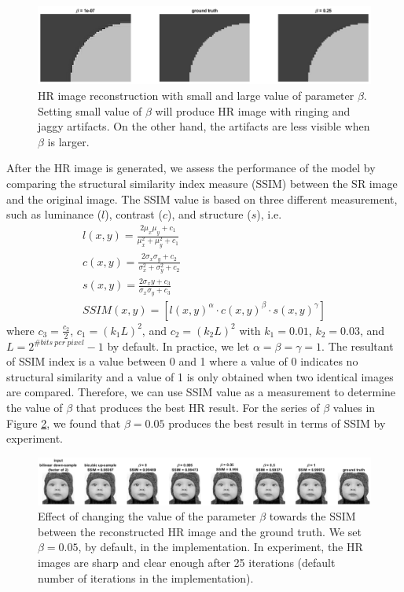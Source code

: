 \documentclass[a4paper,11pt]{article}
\begin{document}
\begin{figure}[H]
	\centering
	\includegraphics[width=1\textwidth]{large small beta.png}
	\caption{HR image reconstruction with small and large value of parameter $\beta$. Setting small value of $\beta$ will produce HR image with ringing and jaggy artifacts. On the other hand, the artifacts are less visible when $\beta$ is larger.}
	\label{fig:beta2}
\end{figure}
 
After the HR image is generated, we assess the performance of the model by comparing the structural similarity index measure (SSIM) between the SR image and the original image. The SSIM value is based on three different measurement, such as luminance ($l$), contrast ($c$), and structure ($s$), i.e.
\begin{gather*}
	l(x,y) = \frac{2 \mu_x \mu_y + c_1}{\mu_x^2 + \mu_y^2 + c_1}\\
	c(x,y) = \frac{2 \sigma_x \sigma_y + c_2}{\sigma_x^2 + \sigma_y^2 + c_2}\\
	s(x,y) = \frac{2 \sigma_xy + c_3}{\sigma_x \sigma_y + c_3}\\
	SSIM(x,y) = [l(x,y)^\alpha \cdot c(x,y)^\beta \cdot s(x,y)^\gamma]
\end{gather*}
where $c_3 = \frac{c_2}{2}$, $c_1=(k_1L)^2$, and $c_2=(k_2L)^2$ with $k_1=0.01$, $k_2=0.03$, and $L=2^{\#bits\ per\ pixel}-1$ by default. In practice, we let $\alpha = \beta = \gamma = 1$. The resultant of SSIM index is a value between 0 and 1 where a value of 0 indicates no structural similarity and a value of 1 is only obtained when two identical images are compared. Therefore, we can use SSIM value as a measurement to determine the value of $\beta$ that produces the best HR result. For the series of $\beta$ values in Figure \ref{fig:beta}, we found that $\beta = 0.05$ produces the best result in terms of SSIM by experiment.

\begin{figure}[H]
	\centering
	\includegraphics[width=1\textwidth]{beta.png}
	\caption{Effect of changing the value of the parameter $\beta$ towards the SSIM between the reconstructed HR image and the ground truth. We set $\beta = 0.05$, by default, in the implementation. In experiment, the HR images are sharp and clear enough after 25 iterations (default number of iterations in the implementation).}
	\label{fig:beta}
\end{figure}
\end{document}
